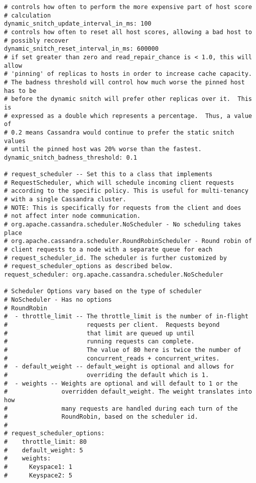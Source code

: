 \begin{verbatim}
# controls how often to perform the more expensive part of host score
# calculation
dynamic_snitch_update_interval_in_ms: 100 
# controls how often to reset all host scores, allowing a bad host to
# possibly recover
dynamic_snitch_reset_interval_in_ms: 600000
# if set greater than zero and read_repair_chance is < 1.0, this will allow
# 'pinning' of replicas to hosts in order to increase cache capacity.
# The badness threshold will control how much worse the pinned host has to be
# before the dynamic snitch will prefer other replicas over it.  This is
# expressed as a double which represents a percentage.  Thus, a value of
# 0.2 means Cassandra would continue to prefer the static snitch values
# until the pinned host was 20% worse than the fastest.
dynamic_snitch_badness_threshold: 0.1

# request_scheduler -- Set this to a class that implements
# RequestScheduler, which will schedule incoming client requests
# according to the specific policy. This is useful for multi-tenancy
# with a single Cassandra cluster.
# NOTE: This is specifically for requests from the client and does
# not affect inter node communication.
# org.apache.cassandra.scheduler.NoScheduler - No scheduling takes place
# org.apache.cassandra.scheduler.RoundRobinScheduler - Round robin of
# client requests to a node with a separate queue for each
# request_scheduler_id. The scheduler is further customized by
# request_scheduler_options as described below.
request_scheduler: org.apache.cassandra.scheduler.NoScheduler

# Scheduler Options vary based on the type of scheduler
# NoScheduler - Has no options
# RoundRobin
#  - throttle_limit -- The throttle_limit is the number of in-flight
#                      requests per client.  Requests beyond 
#                      that limit are queued up until
#                      running requests can complete.
#                      The value of 80 here is twice the number of
#                      concurrent_reads + concurrent_writes.
#  - default_weight -- default_weight is optional and allows for
#                      overriding the default which is 1.
#  - weights -- Weights are optional and will default to 1 or the
#               overridden default_weight. The weight translates into how
#               many requests are handled during each turn of the
#               RoundRobin, based on the scheduler id.
#
# request_scheduler_options:
#    throttle_limit: 80
#    default_weight: 5
#    weights:
#      Keyspace1: 1
#      Keyspace2: 5


\end{verbatim}

